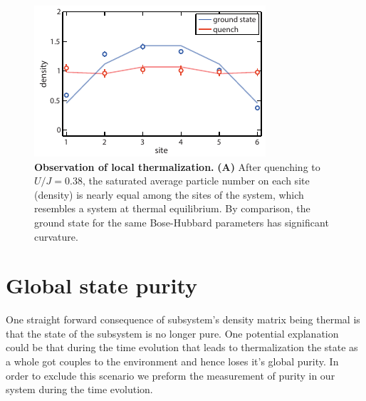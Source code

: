  \begin{figure}[t!]
	\centering
	\includegraphics[scale=1.5]{figures/ETH_density.pdf}
	\caption{{\bf Observation of local thermalization.} {\bf(A)} After quenching to $U/J=0.38$, the saturated average particle number on each site (density) is nearly equal among the sites of the system, which resembles a system at thermal equilibrium. By comparison, the ground state for the same Bose-Hubbard parameters has significant curvature.}
	\label{fig:local}
\end{figure} 

\section{Global state purity}

One straight forward consequence of subsystem's density matrix being thermal is that the state of the subsystem is no longer pure. One potential explanation could be that during the time evolution that leads to thermalization the state as a whole got couples to the environment and hence loses it's global purity. In order to exclude this scenario we preform the measurement of purity in our system during the time evolution. 

